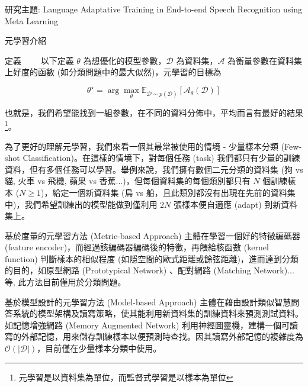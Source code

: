 \documentclass[12pt,UTF8,fntef]{article}
\begin{document}
\begin{section}{研究主題: Language Adaptative Training in End-to-end Speech Recognition using Meta Learning}
\begin{subsection}{元學習介紹}
    \begin{subsubsection}{定義}
      ~~~~以下定義 $\theta$ 為想優化的模型參數，$\mathcal{D}$ 為資料集，$\mathcal{A}$ 為衡量參數在資料集上好度的函數 (如分類問題中的最大似然)，元學習的目標為

      \begin{equation}
        \theta^{\star} = \arg \max_\theta \mathbb{E}_{\mathcal{D} \sim p(\mathcal{D}) }[\mathcal{A}_\theta(\mathcal{D})]
      \end{equation}

      也就是，我們希望能找到一組參數，在不同的資料分佈中，平均而言有最好的結果\footnote{元學習是以資料集為單位，而監督式學習是以樣本為單位}。

      為了更好的理解元學習，我們來看一個其最常被使用的情境 - 少量樣本分類 (Few-shot Classification)。在這樣的情境下，對每個任務 (task) 我們都只有少量的訓練資料，但有多個任務可以學習。舉例來說，我們擁有數個二元分類的資料集 (狗 vs 貓, 火車 vs 飛機, 蘋果 vs 香蕉...)，但每個資料集的每個類別都只有 $N$ 個訓練樣本 ($N \geq 1$)，給定一個新資料集 (鳥 vs 船，且此類別都沒有出現在先前的資料集中)，我們希望訓練出的模型能做到僅利用 $2N$ 張樣本便自適應 (adapt) 到新資料集上。


    \end{subsubsection}

    \begin{subsubsection}{基於度量的元學習方法 (Metric-based Approach)}
  主體在學習一個好的特徵編碼器 (feature encoder)，而經過該編碼器編碼後的特徵，再餵給核函數 (kernel function) 判斷樣本的相似程度 (如隱空間的歐式距離或餘弦距離)，進而達到分類的目的，如原型網路 (Prototypical Network) \cite{snell2017prototypical}、配對網路 (Matching Network)\cite{vinyals2016matching}...等, 此方法目前僅用於分類問題。
    \end{subsubsection}

    \begin{subsubsection}{基於模型設計的元學習方法 (Model-based Approach)}
      主體在藉由設計類似智慧問答系統的模型架構及讀寫策略，使其能利用新資料集的訓練資料來預測測試資料。如記憶增強網路 (Memory Augmented Network) \cite{santoro2016meta}利用神經圖靈機，建構一個可讀寫的外部記憶，用來儲存訓練樣本以便預測時查找。因其讀寫外部記憶的複雜度為 $\mathcal{O}(|\mathcal{D}|)$，目前僅在少量樣本分類中使用。
    \end{subsubsection}


\end{subsection}
\end{section}
\end{document}
